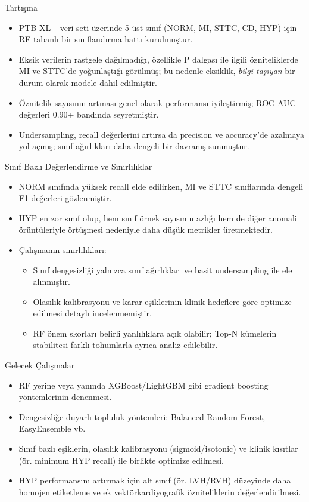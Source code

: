 \documentclass[aspectratio=169]{beamer}
\begin{document}
\begin{frame}{Tartışma}
	\begin{itemize}
		\item PTB-XL+ veri seti üzerinde 5 üst sınıf (NORM, MI, STTC, CD, HYP) için RF tabanlı bir sınıflandırma hattı kurulmuştur.
		\item Eksik verilerin rastgele dağılmadığı, özellikle P dalgası ile ilgili özniteliklerde MI ve STTC'de yoğunlaştığı görülmüş; bu nedenle eksiklik, \emph{bilgi taşıyan} bir durum olarak modele dahil edilmiştir.
		\item Öznitelik sayısının artması genel olarak performansı iyileştirmiş; ROC-AUC değerleri 0.90+ bandında seyretmiştir.
		\item Undersampling, recall değerlerini artırsa da precision ve accuracy'de azalmaya yol açmış; sınıf ağırlıkları daha dengeli bir davranış sunmuştur.
	\end{itemize}
\end{frame}

\begin{frame}{Sınıf Bazlı Değerlendirme ve Sınırlılıklar}
	\begin{itemize}
		\item NORM sınıfında yüksek recall elde edilirken, MI ve STTC sınıflarında dengeli F1 değerleri gözlenmiştir.
		\item HYP en zor sınıf olup, hem sınıf örnek sayısının azlığı hem de diğer anomali örüntüleriyle örtüşmesi nedeniyle daha düşük metrikler üretmektedir.
		\item Çalışmanın sınırlılıkları:
		\begin{itemize}
			\item Sınıf dengesizliği yalnızca sınıf ağırlıkları ve basit undersampling ile ele alınmıştır.
			\item Olasılık kalibrasyonu ve karar eşiklerinin klinik hedeflere göre optimize edilmesi detaylı incelenmemiştir.
			\item RF önem skorları belirli yanlılıklara açık olabilir; Top-N kümelerin stabilitesi farklı tohumlarla ayrıca analiz edilebilir.
		\end{itemize}
	\end{itemize}
\end{frame}

\begin{frame}{Gelecek Çalışmalar}
	\begin{itemize}
		\item RF yerine veya yanında XGBoost/LightGBM gibi gradient boosting yöntemlerinin denenmesi.
		\item Dengesizliğe duyarlı topluluk yöntemleri: Balanced Random Forest, EasyEnsemble vb.
		\item Sınıf bazlı eşiklerin, olasılık kalibrasyonu (sigmoid/isotonic) ve klinik kısıtlar (ör. minimum HYP recall) ile birlikte optimize edilmesi.
		\item HYP performansını artırmak için alt sınıf (ör. LVH/RVH) düzeyinde daha homojen etiketleme ve ek vektörkardiyografik özniteliklerin değerlendirilmesi.
	\end{itemize}
\end{frame}
\end{document}
